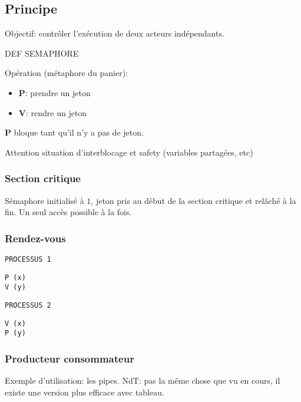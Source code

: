 \documentclass[a4paper]{article}
\begin{document}
\begin{multicols*}{2}
    \subsection{Principe}
    Objectif: contrôler l'exécution de deux acteurs indépendants.

    DEF SEMAPHORE

    Opération (métaphore du panier): 
    \begin{itemize} 
        \item \textbf{P}: prendre un jeton
        \item \textbf{V}: rendre un jeton
    \end{itemize}

    \textbf{P} bloque tant qu'il n'y a pas de jeton. 

    Attention situation d'interblocage et safety (variables partagées, etc)

    \subsubsection{Section critique}

    Sémaphore initialisé à $1$, jeton pris au début de la section critique et relâché à la fin. Un seul accès possible à la fois. 

    \subsubsection{Rendez-vous}

    \begin{multicols}{2}
        \texttt{PROCESSUS 1}
        \begin{lstlisting}
P (x)
V (y)
        \end{lstlisting}

        \columnbreak{}
        
        \texttt{PROCESSUS 2}
        \begin{lstlisting}
V (x)
P (y)
        \end{lstlisting}
    \end{multicols}

    \subsubsection{Producteur consommateur}

    Exemple d'utilisation: les pipes.
    {NdT}: pas la même chose que vu en cours, il existe une version plus efficace avec tableau.


\end{multicols*}
\end{document}
